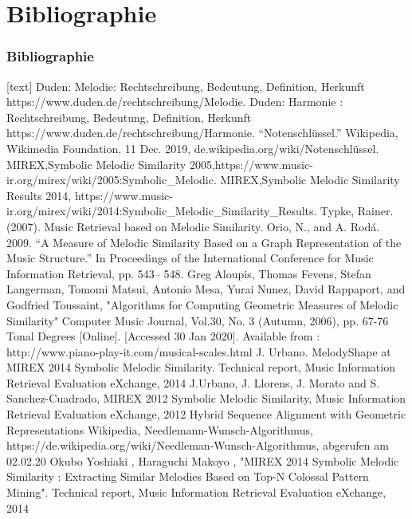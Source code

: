 \documentclass{beamer}
\begin{document}
	\section{Bibliographie}
	\begin{frame}[allowframebreaks]
		\frametitle{Bibliographie}
		\begin{thebibliography}{5}
			[text]
			 Duden: Melodie: Rechtschreibung, Bedeutung, Definition, Herkunft
			https://www.duden.de/rechtschreibung/Melodie.
			 Duden: Harmonie : Rechtschreibung, Bedeutung, Definition, Herkunft
			https://www.duden.de/rechtschreibung/Harmonie.
			 “Notenschlüssel.” Wikipedia, Wikimedia Foundation, 11 Dec. 2019, de.wikipedia.org/wiki/Notenschlüssel.
			 MIREX,Symbolic Melodic Similarity 2005,https://www.music-ir.org/mirex/wiki/2005:Symbolic\_Melodic.
			 MIREX,Symbolic Melodic Similarity Results 2014, https://www.music-ir.org/mirex/wiki/2014:Symbolic\_Melodic\_Similarity\_Results.
			 Typke, Rainer. (2007). Music Retrieval based on Melodic Similarity.
			 Orio, N., and A. Rodá. 2009. “A Measure of Melodic Similarity Based on a Graph Representation of the Music Structure.” In Proceedings of the International Conference for Music Information Retrieval, pp. 543– 548.
			 Greg Aloupis, Thomas Fevens, Stefan Langerman, Tomomi Matsui, Antonio Mesa, Yurai Nunez, David Rappaport, and Godfried Toussaint, "Algorithms for Computing Geometric Measures of Melodic Similarity" Computer Music Journal, Vol.30, No. 3 (Autumn, 2006), pp. 67-76
			 Tonal Degrees [Online]. [Accessed 30 Jan 2020]. Available from : http://www.piano-play-it.com/musical-scales.html
			 J. Urbano. MelodyShape at MIREX 2014 Symbolic
            Melodic Similarity. Technical report, Music Information Retrieval Evaluation eXchange, 2014
            \bibitem[11}{five_point_three} J. Urbano, MIREX 2013 Symbolic Melodic Similarity  A Geometric Model supported with Hybrid Sequence Alignment, Music Information Retrieval Evaluation eXchange, 2013
            \bibitem[12]{five_point_four} J.Urbano, J. Llorens, J. Morato and S. Sanchez-Cuadrado, MIREX 2012 Symbolic Melodic Similarity, Music Information Retrieval Evaluation eXchange, 2012
            Hybrid Sequence Alignment with Geometric Representations
           	 Wikipedia, Needlemann-Wunsch-Algorithmus, https://de.wikipedia.org/wiki/Needleman-Wunsch-Algorithmus, abgerufen am 02.02.20
           	 Okubo Yoshiaki , Haraguchi Makoyo , "MIREX 2014 Symbolic Melodic Similarity : Extracting Similar Melodies Based on Top-N Colossal Pattern Mining". Technical report, Music Information Retrieval Evaluation eXchange, 2014
		\end{thebibliography}
	\end{frame}
\end{document}
